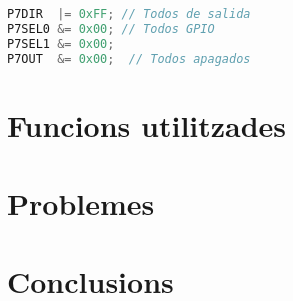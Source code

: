 \documentclass[12pt,a4paper]{article}
\begin{document}
\begin{lstlisting}[language=C++]
P7DIR  |= 0xFF; // Todos de salida
P7SEL0 &= 0x00; // Todos GPIO
P7SEL1 &= 0x00;
P7OUT  &= 0x00;  // Todos apagados
\end{lstlisting}

\section{Funcions utilitzades}

\section{Problemes}

\section{Conclusions}
\end{document}
